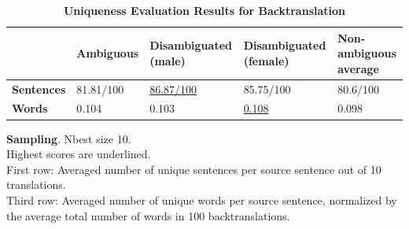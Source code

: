 \begin{table}[!htb]
    \begin{subtable}{\textwidth}
        \centering
        \begin{tabularx}{\linewidth}{|X|XXXX|}
            \hline
             & \textbf{Ambiguous} & \textbf{Disambiguated (male)} & \textbf{Disambiguated (female)} & \textbf{Non-ambiguous average} \\ \hline
             \textbf{Sentences} & 81.81/100 & \underline{86.87/100} & 85.75/100 & 80.6/100 \\ 
             \textbf{Words} & 0.104 & 0.103 & \underline{0.108} & 0.098 \\ \hline
        \end{tabularx}
        \caption{\textbf{Sampling}. Nbest size 10. \\ Highest scores are underlined. \\ First row: Averaged number of unique sentences per source sentence out of 10 translations. \\ Third row: Averaged number of unique words per source sentence, normalized by the average total number of words in 100 backtranslations.}
        \label{tab:uniqueness_backtranslation_sampling}
    \end{subtable}

    \caption{\textbf{Uniqueness Evaluation Results for Backtranslation}}
    \label{tab:uniqueness_backtranslation}
\end{table}

